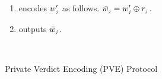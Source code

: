 \begin{figure}[!ht]
\begin{center}
\begin{boxedminipage}{12.3cm}
{\begin{enumerate}
%
%
\begin{equation*}
   w'_{\st j}= 
\begin{cases}
1,              & \text{if } w_{\st j}=1\\
   \alpha_{\st j}\stackrel{\st\$}\leftarrow \mathbb{F}_{\st p} ,& \text{if } w_{\st j}=0
\end{cases}
\end{equation*}
%
\item encodes  $w'_{\scriptscriptstyle j}$ as follows. %
%
$\bar w_{\scriptscriptstyle j}= w'_{\scriptscriptstyle j}\oplus r_{\scriptscriptstyle j}$.
%
\item outputs $\bar{ w}_{\scriptscriptstyle j}$.





%
%
%
%




\
 \end{enumerate}
 
}
\end{boxedminipage}
\end{center}
\caption{Private Verdict Encoding  (PVE) Protocol} 
\label{fig:PVE}
\end{figure}
%
